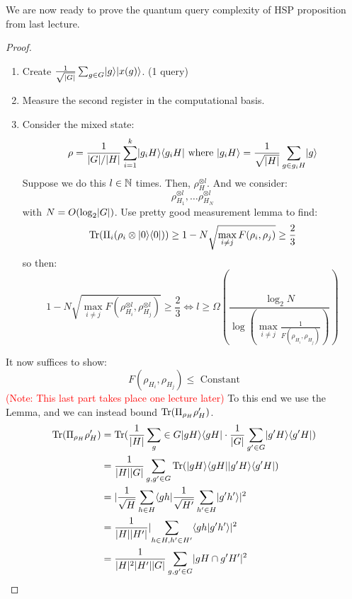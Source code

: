 We are now ready to prove the quantum query complexity of HSP proposition from last lecture.
\begin{proof}
    \begin{enumerate}
        \item Create $\frac{1}{\sqrt{\lvert G \rvert}}\sum_{g \in G}\lvert g \rangle\lvert x(g) \rangle$. (1 query)
        \item Measure the second register in the computational basis.
        \item Consider the mixed state:
        \begin{equation}
            \rho = \frac{1}{\lvert G \rvert/\lvert H \rvert}\sum_{i=1}^k \lvert g_iH \rangle \langle g_iH \rvert \text{ where } \lvert g_iH \rangle = \frac{1}{\sqrt{\lvert H \rvert}}\sum_{g \in g_iH}\lvert g \rangle
        \end{equation}
        Suppose we do this $l \in \mathbb{N}$ times. Then, $\rho_H^{\otimes l}$. And we consider:
        \begin{equation}
            \rho_{H_1}^{\otimes l}, \ldots \rho_{H_N}^{\otimes l}
        \end{equation}
        with $N = O(\log_2\lvert G \rvert)$. Use pretty good measurement lemma to find:
        \begin{equation}
            \mathrm{Tr}(\Pi_i (\rho_i \otimes \lvert 0 \rangle \langle 0 \rvert)) \geq 1 - N\sqrt{\max_{i \neq j}F(\rho_i, \rho_j)} \geq \frac{2}{3}
        \end{equation}
        so then:
        \begin{equation}
            1 - N\sqrt{\max_{i \neq j}F(\rho^{\otimes l}_{H_i}, \rho^{\otimes l}_{H_j})} \geq \frac{2}{3} \iff l \geq \Omega(\frac{\log_2N}{\log(\max_{i \neq j}\frac{1}{F(\rho_{H_i}, \rho_{H_j})})})
        \end{equation}
    \end{enumerate}
    It now suffices to show:
    \begin{equation}
        F(\rho_{H_i}, \rho_{H_j}) \leq \text{ Constant}
    \end{equation}
    \textcolor{red}{(Note: This last part takes place one lecture later)} To this end we use the Lemma, and we can instead bound $\mathrm{Tr}(\Pi_{\rho_H}\rho_H')$.
    \begin{align*}
        \mathrm{Tr}(\Pi_{\rho_H}\rho_H') &= \mathrm{Tr}(\frac{1}{\lvert H \rvert}\sum_g \in G\lvert gH \rangle \langle gH \rvert \cdot \frac{1}{\lvert G \rvert}\sum_{g' \in G}\lvert g'H \rangle \langle g'H \rvert)
        \\ &= \frac{1}{\lvert H \rvert\lvert G \rvert}\sum_{g, g' \in G}\mathrm{Tr}(\lvert gH \rangle \langle gH \rvert\lvert g'H \rangle \langle g'H \rvert)
        \\ &= \lvert \frac{1}{\sqrt{H}}\sum_{h \in H}\langle gh \rvert\frac{1}{\sqrt{H'}}\sum_{h' \in H}\lvert g'h' \rangle \rvert^2
        \\ &= \frac{1}{\lvert H \rvert\lvert H' \rvert}\lvert \sum_{h \in H, h' \in H'}\langle gh \lvert g'h' \rangle \rvert^2
        \\ &= \frac{1}{\lvert H \rvert^2\lvert H' \rvert\lvert G \rvert}\sum_{g, g' \in G}\lvert gH\cap g'H' \rvert^2
    \end{align*}


\end{proof}
